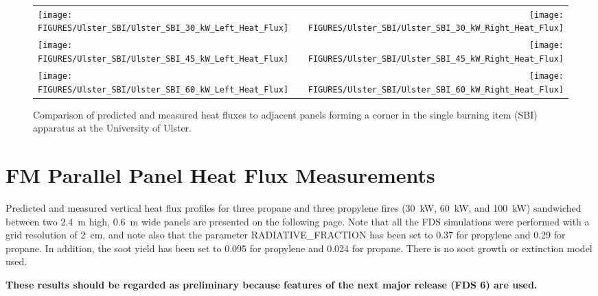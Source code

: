 \begin{figure}[p]
\begin{tabular*}{\textwidth}{l@{\extracolsep{\fill}}r}
\texttt{[image: FIGURES/Ulster\_SBI/Ulster\_SBI\_30\_kW\_Left\_Heat\_Flux]} &
\texttt{[image: FIGURES/Ulster\_SBI/Ulster\_SBI\_30\_kW\_Right\_Heat\_Flux]} \\
\texttt{[image: FIGURES/Ulster\_SBI/Ulster\_SBI\_45\_kW\_Left\_Heat\_Flux]} &
\texttt{[image: FIGURES/Ulster\_SBI/Ulster\_SBI\_45\_kW\_Right\_Heat\_Flux]} \\
\texttt{[image: FIGURES/Ulster\_SBI/Ulster\_SBI\_60\_kW\_Left\_Heat\_Flux]} &
\texttt{[image: FIGURES/Ulster\_SBI/Ulster\_SBI\_60\_kW\_Right\_Heat\_Flux]}
\end{tabular*}
\label{Ulster_SBI}
\caption[Corner heat flux predictions, Ulster SBI experiments.]
{Comparison of predicted and measured heat fluxes to adjacent panels forming a corner in the single
burning item (SBI) apparatus at the University of Ulster.}
\end{figure}

\clearpage

\section{FM Parallel Panel Heat Flux Measurements}

Predicted and measured vertical heat flux profiles for three propane and three propylene fires (30~kW, 60~kW, and
100~kW) sandwiched between two 2.4~m high, 0.6~m wide panels are presented on the following page.
Note that all the FDS simulations were performed with a grid resolution of 2~cm, and note also that
the parameter {\ct RADIATIVE\_FRACTION} has been set to 0.37 for propylene and 0.29 for propane.  In addition, the
soot yield has been set to 0.095 for propylene and 0.024 for propane. There is no soot growth or extinction model
used.

\begin{warning}
\noindent
{\bf These results should be regarded as preliminary because features of the next major release (FDS 6) are used.}
\end{warning}

\newpage

